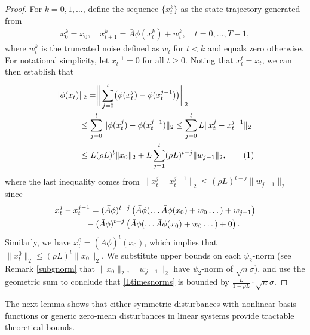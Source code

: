 \documentclass[letterpaper,10pt,conference]{ieeeconf}
\newcommand\numberthis{\addtocounter{equation}{1}\tag{\theequation}}
\theoremstyle{plain} %
\theoremstyle{plain} %
\theoremstyle{plain} %
\theoremstyle{plain}
\begin{document}
\begin{proof}
  For $k=0, 1, \dots$, define the sequence $\{x_t^k\}$ as the state trajectory generated from 
    \begin{align*}
  x_0^k = x_0,\quad     x_{t+1}^k = \bar A \phi(x_{t}^k ) + w_{t}^k, \quad t=0,\dots, T-1,
    \end{align*}
    where $w_t^k$ is the truncated noise defined as $w_t$ for $t<k$ and equals zero otherwise.
 For notational simplicity, let $x_t^{-1} =0$ for all $t\ge 0$.  Noting that $x_t^t=x_t$, we can then establish that 
    \begin{align*}
          \|\phi(x_t)&\|_{2} = \biggr\| \sum_{j=0}^{t}\bigr( \phi(x_t^{j})-\phi(x_t^{j-1})\bigr)\biggr\|_{2}\\&\le \sum_{j=0}^{t} \|\phi(x_t^{j})-\phi(x_t^{j-1})\|_{2} \le  \sum_{j=0}^{t} L\|x_{t}^{j}-x_t^{j-1}\|_{2}\\&\le L(\rho L)^t \|x_0\|_{2} + L\sum_{j=1}^t  (\rho L)^{t-j} \|w_{j-1}\|_{2},\numberthis\label{Ltimesnorms}
    \end{align*}
    where  the last inequality comes from $\|x_{t}^{j}-x_t^{j-1}\|_{2}\le (\rho L)^{t-j} \|w_{j-1}\|_{2}$ since 
    \begin{align}\label{xtjdiff}
       \nonumber& x_{t}^{j}-x_t^{j-1} = (\bar A\phi)^{t-j} \left( \bar A\phi(\dots \bar A\phi(x_0) + w_0 \dots) + w_{j-1} \right)\\&\hspace{13mm} - (\bar A\phi)^{t-j} \left(\bar  A\phi(\dots \bar A\phi(x_0) + w_0 \dots) + 0 \right).
    \end{align}
    Similarly,  we have $x_t^0 = (\bar A\phi)^{t}(x_0)$, which implies that $\|x_t^0\|_{2}\le (\rho L)^t \|x_0\|_{2}$. 
   We
    substitute upper bounds on each $\psi_2$-norm  (see Remark \ref{subgnorm} that $\|x_0\|_2, \|w_{j-1}\|_2$ have $\psi_2$-norm of $\sqrt{n} \sigma$), and 
    use the geometric sum to conclude that \eqref{Ltimesnorms} is bounded by $\frac{L}{1-\rho L}\cdot  \sqrt{n}\sigma$. 
\end{proof}


The next lemma shows that either symmetric disturbances with nonlinear basis functions or generic zero-mean disturbances in linear systems provide tractable theoretical bounds.
\end{document}
